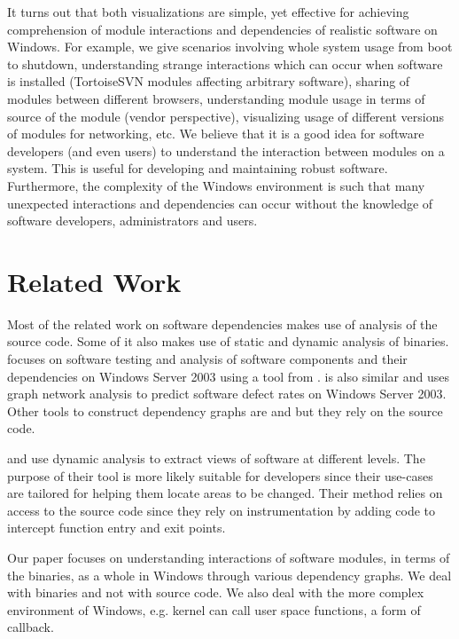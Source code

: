 It turns out that both visualizations are simple, yet effective for
achieving comprehension of module interactions and dependencies
of realistic software on Windows. For example, we give scenarios
involving whole system usage from boot to shutdown, understanding strange
interactions which can occur when software is installed (TortoiseSVN modules
affecting arbitrary software), sharing of modules between different browsers,
understanding module usage in terms of source of the module
(vendor perspective),
visualizing usage of different versions of modules for networking, etc.
We believe that it is a good idea for software developers (and even users)
to understand the interaction between modules on a system.
This is useful for developing and maintaining
robust software. Furthermore, the complexity of the
Windows environment is such that many unexpected interactions
and dependencies can occur without the knowledge of software developers,
administrators and users.

\section{Related Work}

Most of the related work on software dependencies makes use of analysis
of the source code. Some of it also makes use of static and
dynamic analysis of binaries.
\cite{metrics} focuses on software testing and analysis of
software components and their dependencies on Windows Server 2003
using a tool from \cite{testing}.
\cite{network} is also similar and uses graph network analysis
to predict software defect rates on Windows Server 2003.
Other tools to construct dependency graphs are \cite{progdep} and \cite{depvwr}
but they rely on the source code.

\cite{scenario} and \cite{hierarchy} use dynamic analysis to extract
views of software at different levels. The purpose of their tool is more likely
suitable for developers since their use-cases are tailored for helping
them locate areas to be changed. Their method relies on access to the source
code since they rely on instrumentation by adding code to intercept function
entry and exit points.

Our paper focuses on understanding interactions of software modules,
in terms of the binaries, as a whole in Windows through
various dependency graphs. We deal with binaries and not with source code.
We also deal with the more complex environment of Windows, e.g. kernel
can call user space functions, a form of callback.



